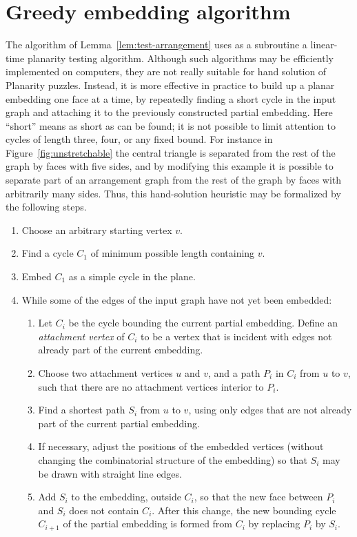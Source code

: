 \documentclass[oribibl]{llncs}
\begin{document}
\section{Greedy embedding algorithm}

The algorithm of Lemma~\ref{lem:test-arrangement} uses as a subroutine a linear-time planarity testing algorithm. Although such algorithms may be efficiently implemented on computers, they are not really suitable for hand solution of Planarity puzzles.
Instead, it is more effective in practice to build up a planar embedding one face at a time, by repeatedly finding a short cycle in the input graph and attaching it to the previously constructed partial embedding. Here ``short'' means as short as can be found; it is not possible to limit attention to cycles of length three, four, or any fixed bound. For instance in Figure~\ref{fig:unstretchable} the central triangle is separated from the rest of the graph by faces with five sides, and by modifying this example it is possible to separate part of an arrangement graph from the rest of the graph by faces with arbitrarily many sides.
Thus, this hand-solution heuristic may be formalized by the following steps.
\begin{enumerate}
\item Choose an arbitrary starting vertex $v$.
\item Find a cycle $C_1$ of minimum possible length containing $v$.
\item Embed $C_1$ as a simple cycle in the plane.
\item While some of the edges of the input graph have not yet been embedded:
\begin{enumerate}
\item Let $C_i$ be the cycle bounding the current partial embedding. Define an \emph{attachment vertex} of $C_i$ to be a vertex that is incident with edges not already part of the current embedding.
\item Choose two attachment vertices $u$ and $v$, and a path $P_i$ in $C_i$ from $u$ to $v$, such that there are no attachment vertices interior to $P_i$.
\item Find a shortest path $S_i$ from $u$ to $v$, using only edges that are not already part of the current partial embedding.
\item If necessary, adjust the positions of the embedded vertices (without changing the combinatorial structure of the embedding) so that $S_i$ may be drawn with straight line edges.
\item Add $S_i$ to the embedding, outside $C_i$, so that the new face between $P_i$ and $S_i$ does not contain $C_i$. After this change, the new bounding cycle $C_{i+1}$ of the partial embedding is formed from $C_i$ by replacing $P_i$ by $S_i$.
\end{enumerate}
\end{enumerate}
\end{document}
